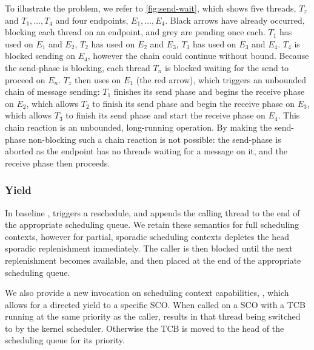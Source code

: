 To illustrate the problem, we refer to \cref{fig:send-wait}, which shows five threads, $T_{z}$ and
$T_{1},\ldots,T_{4}$ and four endpoints, $E_{1},\dots,E_{4}$. Black arrows have already
occurred, blocking each thread on an endpoint, and grey are pending once each. $T_{1}$ has used \sendrecv on
$E_{1}$ and $E_{2}$, $T_{2}$ has used \sendrecv on $E_{2}$ and $E_{3}$,  
$T_{3}$ has used \sendrecv on $E_{3}$ and $E_{4}$. $T_{4}$ is blocked sending on $E_{4}$,
however the chain could continue without bound.
Because the send-phase is blocking, each thread $T_{n}$ is blocked waiting for the send to proceed 
on $E_{n}$. $T_{z}$ then uses \recv on $E_{1}$ (the red arrow), which triggers an unbounded chain of message
sending: $T_{1}$ finishes its send phase and begins the receive phase on $E_{2}$, which allows
$T_{2}$ to finish its send phase and begin the receive phase on $E_{3}$, which allows $T_{3}$ to
finish its send phase and start the receive phase on $E_{4}$. This chain reaction is an
unbounded, long-running operation. By making the send-phase non-blocking such a chain reaction is not
possible: the send-phase is aborted as the endpoint has no threads waiting for a message on it, and
the receive phase then proceeds. 

\subsubsection{Yield}

In baseline \selfour, \yield triggers a reschedule, and appends the calling thread to the end of the
appropriate scheduling queue. We retain these semantics for full scheduling contexts, however 
for partial, sporadic scheduling contexts \yield depletes the head sporadic replenishment immediately. The
caller is then blocked until the next replenishment becomes available, and then placed at the end of
the appropriate scheduling queue.

We also provide a new invocation on scheduling context capabilities, \scyieldto, which allows for a directed
yield to a specific \gls{SCO}. When called on a \gls{SCO} with a \gls{TCB} running at the same
priority as the caller, \scyieldto results in that thread being switched to by the kernel scheduler.
Otherwise the \gls{TCB} is moved to the head of the scheduling queue for its priority.

